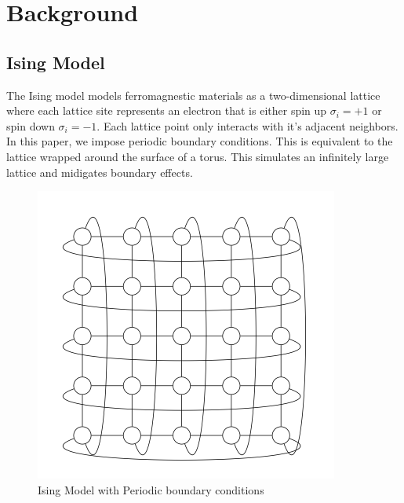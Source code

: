 \documentclass{article}
\begin{document}
\section{Background}
\label{Mathematical Background}
    \subsection{Ising Model}
    The Ising model models ferromagnestic materials as a two-dimensional lattice where each lattice site represents an 
    electron that is either spin up $\sigma_i = +1$ or spin down $\sigma_i = -1$. Each lattice point only interacts
    with it's adjacent neighbors. In this paper, we impose periodic boundary conditions. This is equivalent to the lattice wrapped around the surface of a torus. This simulates 
    an infinitely large lattice and midigates boundary effects. 
    
    \begin{figure}[ht]
        \includegraphics[width=\columnwidth]{diagrams/loopy_ising_model.png}
        \caption{Ising Model with Periodic boundary conditions}
        \label{fig:1}
    \end{figure}
    
\end{document}
